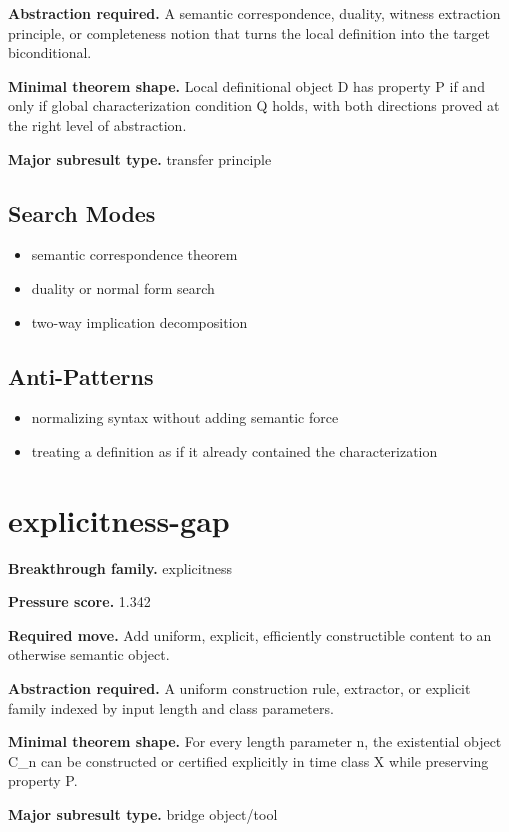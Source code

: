 \documentclass[11pt]{article}
\begin{document}
\textbf{Abstraction required.} A semantic correspondence, duality, witness extraction principle, or completeness notion that turns the local definition into the target biconditional.

\textbf{Minimal theorem shape.} Local definitional object D has property P if and only if global characterization condition Q holds, with both directions proved at the right level of abstraction.

\textbf{Major subresult type.} transfer principle

\subsection*{Search Modes}
\begin{itemize}[leftmargin=*,itemsep=0.2em]
\item semantic correspondence theorem
\item duality or normal form search
\item two-way implication decomposition
\end{itemize}
\subsection*{Anti-Patterns}
\begin{itemize}[leftmargin=*,itemsep=0.2em]
\item normalizing syntax without adding semantic force
\item treating a definition as if it already contained the characterization
\end{itemize}
\section{explicitness-gap}
\textbf{Breakthrough family.} explicitness

\textbf{Pressure score.} 1.342

\textbf{Required move.} Add uniform, explicit, efficiently constructible content to an otherwise semantic object.

\textbf{Abstraction required.} A uniform construction rule, extractor, or explicit family indexed by input length and class parameters.

\textbf{Minimal theorem shape.} For every length parameter n, the existential object C\_n can be constructed or certified explicitly in time class X while preserving property P.

\textbf{Major subresult type.} bridge object/tool
\end{document}
